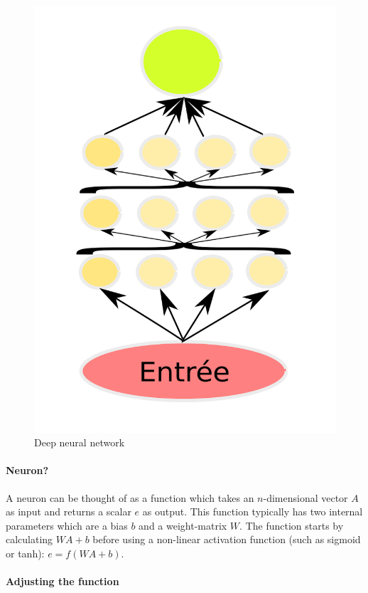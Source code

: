 \documentclass[conference]{IEEEtran}
\begin{document}
\begin{figure}[!tbp]
\begin{minipage}[b]{0.225\textwidth}
    \includegraphics[width=\textwidth]{Deep}
    \caption{Deep neural network}
  \end{minipage}
\end{figure}


\paragraph{Neuron?}
A neuron can be thought of as a function which takes an $n$-dimensional vector
$A$ as input and returns a scalar $e$ as output. This function typically has two
internal parameters which are a bias $b$ and a weight-matrix $W$. The function
starts by calculating $WA+b$ before using a non-linear activation function (such as sigmoid or tanh): $e=f(WA+b)$.

\paragraph{Adjusting the function}
\end{document}
